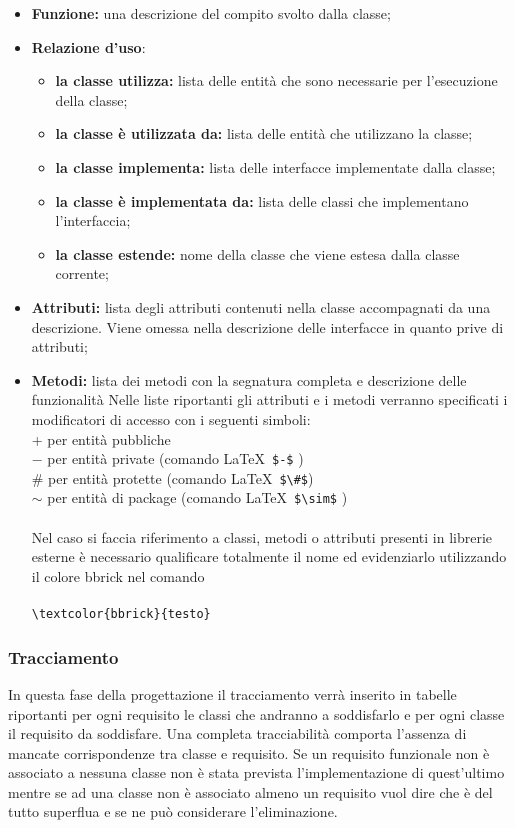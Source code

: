 	\begin{itemize}
	\item \textbf{Funzione:} una descrizione del compito svolto dalla classe;
	\item \textbf{Relazione d’uso}:
	\begin{itemize}
	\item \textbf{la classe utilizza:} lista delle entità che sono necessarie per l’esecuzione della classe;
	\item \textbf{la classe è utilizzata da:} lista delle entità che utilizzano la classe;
	\item \textbf{la classe implementa:} lista delle interfacce implementate dalla classe;
	\item \textbf{la classe è implementata da:} lista delle classi che implementano l’interfaccia;
	\item \textbf{la classe estende:} nome della classe che viene estesa dalla classe corrente;
	\end{itemize}
	\item \textbf{Attributi:} lista degli attributi contenuti nella classe accompagnati da una descrizione. Viene omessa nella descrizione delle interfacce in quanto prive di attributi;
	\item \textbf{Metodi:} lista dei metodi con la segnatura completa e descrizione delle funzionalità Nelle liste riportanti gli attributi e i metodi verranno specificati i modificatori di accesso con i seguenti simboli:\\
    
	+ per entità pubbliche\\
    $-$  per entità private (comando \LaTeX \ \verb|$-$| ) \\
	\#  per entità protette (comando \LaTeX  \ \verb|$\#$|)\\
	$\sim$ per entità di package (comando \LaTeX  \  \verb|$\sim$| ) \\\\
	Nel caso si faccia riferimento a classi, metodi o attributi presenti in librerie esterne è necessario qualificare totalmente il nome ed evidenziarlo utilizzando il	colore bbrick nel comando\\\\
	 
	\verb|\textcolor{bbrick}{testo}| 
	

	\end{itemize}
	\subsubsection{Tracciamento}
	In questa fase della progettazione il tracciamento verrà inserito in tabelle riportanti	per ogni requisito le classi che andranno a soddisfarlo e per ogni classe il requisito da soddisfare.
	Una completa tracciabilità comporta l’assenza di mancate corrispondenze tra	classe e requisito.	Se un requisito funzionale non è associato a nessuna classe non è stata prevista l’implementazione di quest’ultimo mentre se ad una classe non è associato almeno un requisito vuol dire che è del tutto superflua e se ne può considerare l’eliminazione.
	
